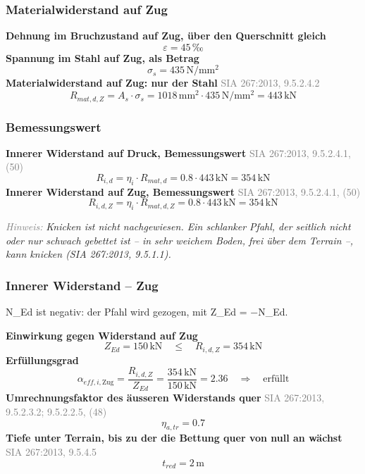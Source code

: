 \documentclass[11pt,a4paper]{article}
\newcommand{\normref}[1]{{\small\textcolor{gray}{#1}}}
\newcommand{\hinweis}[2]{\par\noindent\textcolor{gray}{\textit{#1:}} \textit{#2}\par}
\begin{document}
\subsubsection{Materialwiderstand auf Zug}
\noindent\textbf{Dehnung im Bruchzustand auf Zug, über den Querschnitt gleich}
\begin{equation*}
\varepsilon = 45\,\text{‰}
\end{equation*}
\noindent\textbf{Spannung im Stahl auf Zug, als Betrag}
\begin{equation*}
\sigma_s = 435\,\mathrm{N}/\mathrm{mm}^{2}
\end{equation*}
\noindent\textbf{Materialwiderstand auf Zug: nur der Stahl} \hfill \normref{SIA 267:2013, 9.5.2.4.2}
\begin{equation*}
R_{mat,d,Z} = A_s \cdot \sigma_s = 1018\,\mathrm{mm}^{2} \cdot 435\,\mathrm{N}/\mathrm{mm}^{2} = 443\,\mathrm{kN}
\end{equation*}
\subsubsection{Bemessungswert}
\noindent\textbf{Innerer Widerstand auf Druck, Bemessungswert} \hfill \normref{SIA 267:2013, 9.5.2.4.1, (50)}
\begin{equation*}
R_{i,d} = \eta_i \cdot R_{mat,d} = 0.8 \cdot 443\,\mathrm{kN} = 354\,\mathrm{kN}
\end{equation*}
\noindent\textbf{Innerer Widerstand auf Zug, Bemessungswert} \hfill \normref{SIA 267:2013, 9.5.2.4.1, (50)}
\begin{equation*}
R_{i,d,Z} = \eta_i \cdot R_{mat,d,Z} = 0.8 \cdot 443\,\mathrm{kN} = 354\,\mathrm{kN}
\end{equation*}
\hinweis{Hinweis}{Knicken ist nicht nachgewiesen. Ein schlanker Pfahl, der seitlich nicht oder nur schwach gebettet ist -- in sehr weichem Boden, frei über dem Terrain --, kann knicken (SIA 267:2013, 9.5.1.1).}
\subsubsection{Innerer Widerstand – Zug}
N\_Ed ist negativ: der Pfahl wird gezogen, mit Z\_Ed = −N\_Ed.

\noindent\textbf{Einwirkung gegen Widerstand auf Zug}
\begin{equation*}
Z_{Ed} = 150\,\mathrm{kN} \quad \le \quad R_{i,d,Z} = 354\,\mathrm{kN}
\end{equation*}
\noindent\textbf{Erfüllungsgrad}
\begin{equation*}
\alpha_{eff,i,\text{Zug}} = \frac{R_{i,d,Z}}{Z_{Ed}} = \frac{354\,\mathrm{kN}}{150\,\mathrm{kN}} = 2.36 \quad \Rightarrow \quad \text{erfüllt}
\end{equation*}
\noindent\textbf{Umrechnungsfaktor des äusseren Widerstands quer} \hfill \normref{SIA 267:2013, 9.5.2.3.2; 9.5.2.2.5, (48)}
\begin{equation*}
\eta_{a,tr} = 0.7
\end{equation*}
\noindent\textbf{Tiefe unter Terrain, bis zu der die Bettung quer von null an wächst} \hfill \normref{SIA 267:2013, 9.5.4.5}
\begin{equation*}
t_{red} = 2\,\mathrm{m}
\end{equation*}
\end{document}
